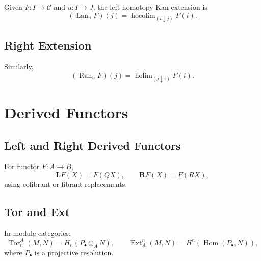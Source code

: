 Given $F: I\to\mathcal{C}$ and $u:I\to J$, the left homotopy Kan extension is
\[
(\operatorname{Lan}_u F)(j)
  = \operatorname{hocolim}_{(i\downarrow j)} F(i).
\]

\subsection{Right Extension}

Similarly,
\[
(\operatorname{Ran}_u F)(j)
  = \operatorname{holim}_{(j\downarrow i)} F(i).
\]

\section{Derived Functors}

\subsection{Left and Right Derived Functors}

For functor $F: A\to B$,
\[
\mathbf{L}F(X) = F(QX),
\qquad
\mathbf{R}F(X) = F(RX),
\]
using cofibrant or fibrant replacements.

\subsection{Tor and Ext}

In module categories:
\[
\operatorname{Tor}^A_n(M,N) = H_n(P_\bullet \otimes_A N),
\qquad
\operatorname{Ext}^n_A(M,N) = H^n(\operatorname{Hom}(P_\bullet,N)),
\]
where $P_\bullet$ is a projective resolution.


